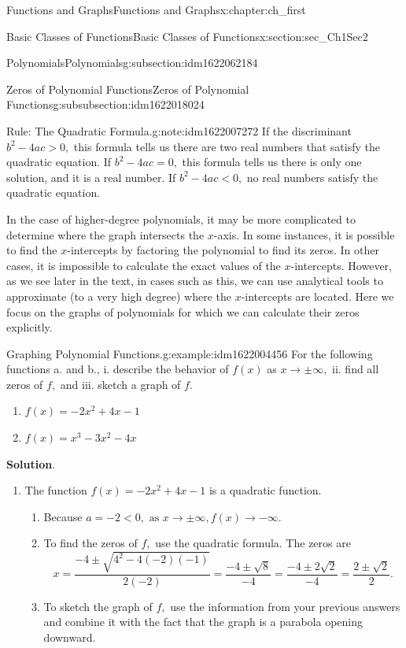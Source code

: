 \documentclass[oneside,10pt,]{book}
\newcommand{\blocktitlefont}{\relax}
\numberwithin{equation}{section}
\newcommand{\lt}{<}
\newcommand{\gt}{>}
\begin{document}
\begin{chapterptx}{Functions and Graphs}{}{Functions and Graphs}{}{}{x:chapter:ch_first}
\begin{sectionptx}{Basic Classes of Functions}{}{Basic Classes of Functions}{}{}{x:section:sec_Ch1Sec2}
\begin{subsectionptx}{Polynomials}{}{Polynomials}{}{}{g:subsection:idm1622062184}
\begin{subsubsectionptx}{Zeros of Polynomial Functions}{}{Zeros of Polynomial Functions}{}{}{g:subsubsection:idm1622018024}
\begin{note}{Rule: The Quadratic Formula.}{g:note:idm1622007272}
If the discriminant \(b^2- 4 ac\gt  0 ,\) this formula tells us there are two real numbers that satisfy the quadratic equation. If \(b^2- 4 ac= 0 ,\) this formula tells us there is only one solution, and it is a real number. If \(b^2- 4 ac\lt  0 ,\) no real numbers satisfy the quadratic equation.%
\end{note}
In the case of higher-degree polynomials, it may be more complicated to determine where the graph intersects the \(x\)-axis. In some instances, it is possible to find the \(x\)-intercepts by factoring the polynomial to find its zeros. In other cases, it is impossible to calculate the exact values of the \(x\)-intercepts. However, as we see later in the text, in cases such as this, we can use analytical tools to approximate (to a very high degree) where the \(x\)-intercepts are located. Here we focus on the graphs of polynomials for which we can calculate their zeros explicitly.%
\begin{example}{Graphing Polynomial Functions.}{g:example:idm1622004456}%
For the following functions a. and b., i. describe the behavior of \(f(x)\) as \(x\to \pm\infty,\) ii. find all zeros of \(f,\) and iii. sketch a graph of \(f.\)%
%
\begin{enumerate}
\item{}\(\displaystyle f(x)= -2 x^2 + 4 x- 1 \)%
\item{}\(\displaystyle f(x)=x^3 - 3 x^2 - 4 x\)%
\end{enumerate}
\par\smallskip%
\noindent\textbf{\blocktitlefont Solution}.\hypertarget{g:solution:idm1622000872}{}\quad{}%
\begin{enumerate}
\item{}The function \(f(x)= -2 x^2 + 4 x- 1 \) is a quadratic function.%
%
\begin{enumerate}
\item{}Because \(a= -2 \lt  0 ,\text{ as } x\to \pm\infty,f(x)\to -\infty.\)%
\item{}To find the zeros of \(f,\) use the quadratic formula. The zeros are%
\begin{equation*}
x= \frac{ -4 \pm \sqrt{ 4^2- 4 ( -2 )( -1 )}}{ 2 ( -2 )}= \frac{ -4 \pm \sqrt{ 8 }}{ -4 }= \frac{ -4 \pm  2 \sqrt{ 2 }}{ -4 }=\frac{ 2 \pm \sqrt{ 2 }}{ 2 }.
\end{equation*}
%
\item{}To sketch the graph of \(f,\) use the information from your previous answers and combine it with the fact that the graph is a parabola opening downward.%
\begin{image}{0.25}{0.5}{0.25}%

\end{image}
\end{enumerate}
\end{enumerate}
\end{example}
\end{subsubsectionptx}
\end{subsectionptx}
\end{sectionptx}
\end{chapterptx}
\end{document}
